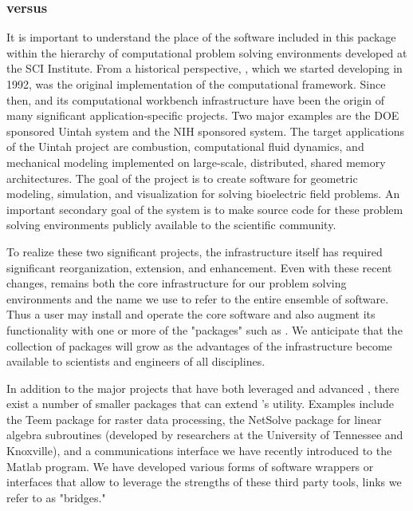\subsubsection{\SR{} versus \PSE{}}

It is important to understand the place of the software included in this
package within the hierarchy of computational problem solving environments
developed at the SCI Institute.  From a historical perspective, \SR{},
which we started developing in 1992, was the original implementation of the
computational
framework\cite{CRJ:Joh94c,RSM:Par95,RSM:Par95b,RSM:Par97,RSM:Par97b,CRJ:Parker99b}.
Since then, \SR{} and its computational workbench infrastructure have been
the origin of many significant application-specific projects.  Two major
examples are the DOE sponsored Uintah system \cite{RSM:Dav2000} and the NIH
sponsored \PSE{} system.  The target applications of the Uintah project are
combustion, computational fluid dynamics, and mechanical modeling
implemented on large-scale, distributed, shared memory architectures.  The
goal of the \PSE{} project is to create software for geometric modeling,
simulation, and visualization for solving bioelectric field problems.  An
important secondary goal of the \SR{} system is to make source code for
these problem solving environments publicly available to the scientific
community.

To realize these two significant projects, the \SR{} infrastructure itself
has required significant reorganization, extension, and enhancement.  Even
with these recent changes, \SR{} remains both the core infrastructure for
our problem solving environments and the name we use to refer to the entire
ensemble of software.  Thus a user may install and operate the core \SR{}
software and also augment its functionality with one or more of the
"packages" such as \PSE{}.  We anticipate that the collection of packages
will grow as the advantages of the \SR{} infrastructure become available
to scientists and engineers of all disciplines.

In addition to the major projects that have both leveraged and advanced
\SR{}, there exist a number of smaller packages that can extend \SR{}'s
utility.  Examples include the Teem package for raster data processing, the
NetSolve package for linear algebra subroutines (developed by researchers
at the University of Tennessee and Knoxville), and a communications
interface we have recently introduced to the Matlab program.  We have
developed various forms of software wrappers or interfaces that allow
\SR{} to leverage the strengths of these third party tools, links we refer
to as "bridges."

